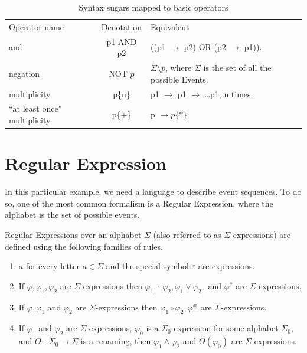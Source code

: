 		\begin{table}
		\caption{Syntax sugars mapped to basic operators}		
		\label{tab:cep:veplsugartobasic}
		\begin{tabular}{lcm{6cm}}
		\centering
		Operator name &	Denotation & Equivalent \\
		and &	p1 AND p2 & ((p1 $\rightarrow$ p2) OR (p2 $\rightarrow$ p1)). \\
		negation &	NOT $p$ & $\Sigma \setminus p$, where $\Sigma$ is the set of all the possible Events. \\
		multiplicity &	p\{n\} &	p1 $\rightarrow$ p1 $\rightarrow$ \dots p1, n times. \\
		``at least once" multiplicity &	p\{+\} & p $\rightarrow p\{\ast\}$ \\
		\end{tabular}
		\end{table}

		
	\section{Regular Expression}
		In this particular example, we need a language to describe event sequences. To do so, one of the most common
		formalism is a Regular Expression, where the alphabet is the set of possible events.
		
		\begin{dfn}
			\label{dfn:cep:tre}
			Regular Expressions over an alphabet $\Sigma$ (also referred to as $\Sigma$-expressions)
			are defined using the following families of rules.
			\begin{enumerate}
				\item \underline{$a$} for every letter $a \in \Sigma$ and the special symbol $\varepsilon$ are expressions.
				\item If $\varphi, \varphi_1, \varphi_2$ are $\Sigma$-expressions then
					$\varphi_1~\cdot~\varphi_2, \varphi_1 \vee \varphi_2,$ and $\varphi^\ast$ are $\Sigma$-expressions.
				\item If $\varphi, \varphi_1$ and $\varphi_2$ are $\Sigma$-expressions then $\varphi_1 \circ \varphi_2, \varphi^\circledast$ are
					$\Sigma$-expressions.
				\item If $\varphi_1$ and $\varphi_2$ are $\Sigma$-expressions, $\varphi_0$ is a $\Sigma_0$-expression
					for some alphabet $\Sigma_0$, and $\Theta$ : $\Sigma_0 \rightarrow \Sigma$ is
					a renaming, then $\varphi_1 \wedge \varphi_2$ and $\Theta(\varphi_0)$ are $\Sigma$-expressions.
			\end{enumerate}
		\end{dfn}
		
